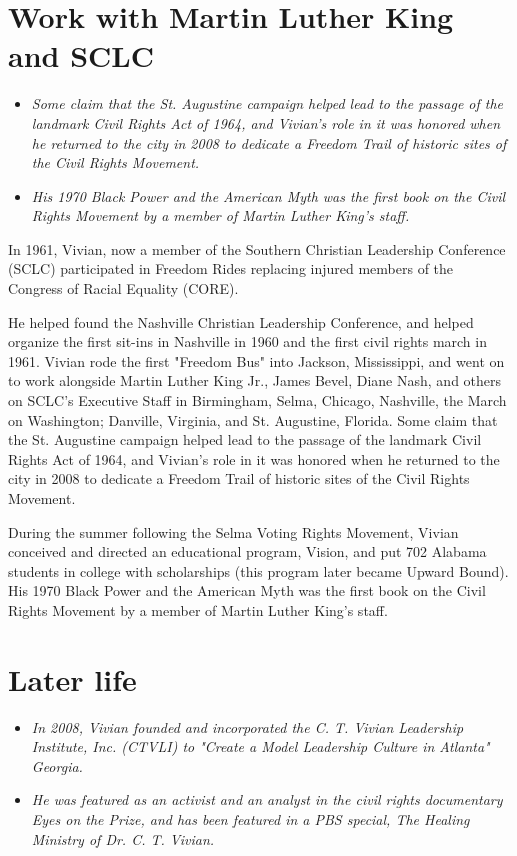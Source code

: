 \section{Work with Martin Luther King and
SCLC}\label{work-with-martin-luther-king-and-sclc}

\begin{itemize}
\item
  \emph{Some claim that the St. Augustine campaign helped lead to the
  passage of the landmark Civil Rights Act of 1964, and Vivian's role in
  it was honored when he returned to the city in 2008 to dedicate a
  Freedom Trail of historic sites of the Civil Rights Movement.}
\item
  \emph{His 1970 Black Power and the American Myth was the first book on
  the Civil Rights Movement by a member of Martin Luther King's staff.}
\end{itemize}

In 1961, Vivian, now a member of the Southern Christian Leadership
Conference (SCLC) participated in Freedom Rides replacing injured
members of the Congress of Racial Equality (CORE).

He helped found the Nashville Christian Leadership Conference, and
helped organize the first sit-ins in Nashville in 1960 and the first
civil rights march in 1961. Vivian rode the first "Freedom Bus" into
Jackson, Mississippi, and went on to work alongside Martin Luther King
Jr., James Bevel, Diane Nash, and others on SCLC's Executive Staff in
Birmingham, Selma, Chicago, Nashville, the March on Washington;
Danville, Virginia, and St. Augustine, Florida. Some claim that the St.
Augustine campaign helped lead to the passage of the landmark Civil
Rights Act of 1964, and Vivian's role in it was honored when he returned
to the city in 2008 to dedicate a Freedom Trail of historic sites of the
Civil Rights Movement.

During the summer following the Selma Voting Rights Movement, Vivian
conceived and directed an educational program, Vision, and put 702
Alabama students in college with scholarships (this program later became
Upward Bound). His 1970 Black Power and the American Myth was the first
book on the Civil Rights Movement by a member of Martin Luther King's
staff.

\section{Later life}\label{later-life}

\begin{itemize}
\item
  \emph{In 2008, Vivian founded and incorporated the C. T. Vivian
  Leadership Institute, Inc. (CTVLI) to "Create a Model Leadership
  Culture in Atlanta" Georgia.}
\item
  \emph{He was featured as an activist and an analyst in the civil
  rights documentary Eyes on the Prize, and has been featured in a PBS
  special, The Healing Ministry of Dr. C. T. Vivian.}
\end{itemize}

